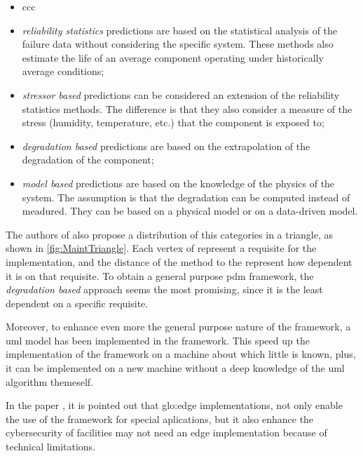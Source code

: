 \begin{itemize}
    \item ccc%
    \item \emph{reliability statistics} predictions are based on the statistical analysis of the failure data without considering the specific system. These methods also estimate the life
    of an average component operating under historically average conditions;
    \item \emph{stressor based} predictions can be considered an extension of the reliability statistics methods. The difference is that they also consider a measure of the stress (humidity, temperature, etc.) that the component is exposed to;
    \item \emph{degradation based} predictions are based on the extrapolation of the degradation of the component;
    \item \emph{model based} predictions are based on the knowledge of the physics of the system. The assumption is that the degradation can be computed instead of meadured. They can be based on a physical model or on a data-driven model.
\end{itemize}


The authors of \cite{Maintenance_cat} also propose a distribution of this categories in a triangle, as shown in \autoref{fig:MaintTriangle}. Each vertex of represent a requisite for the implementation, and the distance of the method to the represent how dependent it is on that requisite. To obtain a general purpose \gls{pdm} framework, the \emph{degradation based} approach seems the most promising, since it is the least dependent on a specific requisite.

Moreover, to enhance even more the general purpose nature of the framework, a \gls{uml} model has been implemented in the framework. This speed up the implementation of the framework on a machine about which little is known, plus, it can be implemented on a new machine without a deep knowledge of the \gls{uml} algorithm themeself.

In the paper \cite{GridPredictMaintenance}, it is pointed out that \gls{glo:edge} implementations, not only enable the use of the framework for special aplications, but it also enhance the cybersecurity of facilities may not need an edge implementation because of technical limitations.